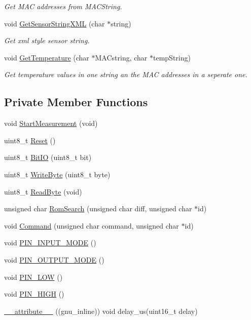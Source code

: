 \begin{DoxyCompactItemize}
\begin{DoxyCompactList}\small\item\em Get M\+AC addresses from M\+A\+C\+String. \end{DoxyCompactList}\item 
void \hyperlink{classDS18B20_a64a03b4a18a9d2b3faeb7943865055e9}{Get\+Sensor\+String\+X\+ML} (char $\ast$string)
\begin{DoxyCompactList}\small\item\em Get xml style sensor string. \end{DoxyCompactList}\item 
void \hyperlink{classDS18B20_ae3d50f1b5b71517d633958f54654ea55}{Get\+Temperature} (char $\ast$M\+A\+Cstring, char $\ast$temp\+String)
\begin{DoxyCompactList}\small\item\em Get temperature values in one string an the M\+AC addresses in a seperate one. \end{DoxyCompactList}\end{DoxyCompactItemize}
\subsection*{Private Member Functions}
\begin{DoxyCompactItemize}
\item 
void \hyperlink{classDS18B20_a817183f6ef9552d6559d58d714e5c804}{Start\+Measurement} (void)
\item 
uint8\+\_\+t \hyperlink{classDS18B20_a890b94747fbd3ec6e45088735c7bc1fe}{Reset} ()
\item 
uint8\+\_\+t \hyperlink{classDS18B20_ac2bf79674d18e4ad00d7b41d76d411e3}{Bit\+IO} (uint8\+\_\+t bit)
\item 
uint8\+\_\+t \hyperlink{classDS18B20_a7314cb6a438ddd0c214ed409f7dd5d86}{Write\+Byte} (uint8\+\_\+t byte)
\item 
uint8\+\_\+t \hyperlink{classDS18B20_aa43d0c42ebb25bbdc9b7904710652c75}{Read\+Byte} (void)
\item 
unsigned char \hyperlink{classDS18B20_a356e88e8a6bca4f5ffeb41180c08f91d}{Rom\+Search} (unsigned char diff, unsigned char $\ast$id)
\item 
void \hyperlink{classDS18B20_a1f03dae7ea2d07a225343eaa33d119cf}{Command} (unsigned char command, unsigned char $\ast$id)
\item 
void \hyperlink{classDS18B20_abd68014bd97396c4b0365d3e1ca1f61c}{P\+I\+N\+\_\+\+I\+N\+P\+U\+T\+\_\+\+M\+O\+DE} ()
\item 
void \hyperlink{classDS18B20_aaa611dcdffd8f02719f62c8a93c0c7c0}{P\+I\+N\+\_\+\+O\+U\+T\+P\+U\+T\+\_\+\+M\+O\+DE} ()
\item 
void \hyperlink{classDS18B20_a8a8a45bbfe229978ea7280177b6fe18b}{P\+I\+N\+\_\+\+L\+OW} ()
\item 
void \hyperlink{classDS18B20_af9d029958b4a835a15867df7ad59d7d3}{P\+I\+N\+\_\+\+H\+I\+GH} ()
\item 
\hyperlink{classDS18B20_a458a891af1a3631958fa84c5b5bbc457}{\+\_\+\+\_\+attribute\+\_\+\+\_\+} ((gnu\+\_\+inline)) void delay\+\_\+us(uint16\+\_\+t delay)
\end{DoxyCompactItemize}
